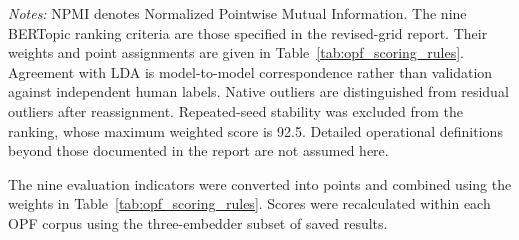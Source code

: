\documentclass[a4paper,fleqn]{cas-sc}
\begin{document}
\begin{table}[htbp]
\begin{tabularx}{\textwidth}{p{30mm}p{25mm}X p{16mm}}
\bottomrule
\end{tabularx}
\vspace{2mm}
\begin{minipage}{\textwidth}
\footnotesize
\textit{Notes:} NPMI denotes Normalized Pointwise Mutual Information. The nine BERTopic ranking criteria are those specified in the revised-grid report. Their weights and point assignments are given in Table~\ref{tab:opf_scoring_rules}. Agreement with LDA is model-to-model correspondence rather than validation against independent human labels. Native outliers are distinguished from residual outliers after reassignment. Repeated-seed stability was excluded from the ranking, whose maximum weighted score is 92.5. Detailed operational definitions beyond those documented in the report are not assumed here.
\end{minipage}
\end{table}
The nine evaluation indicators were converted into points and combined using the weights in Table~\ref{tab:opf_scoring_rules}. Scores were recalculated within each OPF corpus using the three-embedder subset of saved results.
\end{document}
